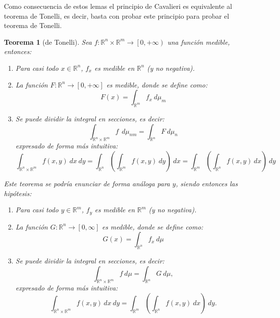 \documentclass[10pt,a4paper,openright]{book}
\theoremstyle{break}
\newtheorem*{theo}{Teorema}
\newcommand{\dif}[1]{\ d#1}
\begin{document}
Como consecuencia de estos lemas el principio de Cavalieri es equivalente al teorema de Tonelli, es decir, basta con probar este principio para probar el teorema de Tonelli.

\begin{theo}[de Tonelli]
Sea $f: \mathbb{R}^{n} \times \mathbb{R}^m \rightarrow \left[0, +\infty\right)$ una función medible, entonces: 
\begin{enumerate}
    \item Para casi todo $x \in \mathbb{R}^n$, $f_x$ es medible en $\mathbb{R}^n$ (y no negativa).
    \item La función $F: \mathbb{R}^{n} \rightarrow \left[0, +\infty\right]$ es medible, donde se define como:
        $$F \left(x\right) = \int_{\mathbb{R}^m} f_x \dif{\mu_m} $$
    \item Se puede dividir la integral en secciones, es decir:
        $$\int_{\mathbb{R}^n \times \mathbb{R}^m} f \ \dif{\mu_{nm}} = \int_{\mathbb{R}^n} F \dif{\mu_n} $$
    expresado de forma más intuitiva:
    $$\int_{\mathbb{R}^n \times \mathbb{R}^m} f \left(x, y\right) \dif{x}\dif{y} = \int_{\mathbb{R}^n}\left(\int_{\mathbb{R}^m} f \left(x, y\right) \dif{y} \right)\dif{x} = \int_{\mathbb{R}^m}\left(\int_{\mathbb{R}^n} f \left(x, y\right) \dif{x} \right)\dif{y}$$
\end{enumerate}
Este teorema se podría enunciar de forma análoga para $y$, siendo entonces las hipótesis:
\begin{enumerate}
\item Para casi todo $y \in \mathbb{R}^m$, $f_y$ es medible en $\mathbb{R}^m$ (y no negativa).
\item La función $G: \mathbb{R}^n \rightarrow \left[0, \infty\right]$ es medible, donde se define como:
$$G \left(x\right) = \int_{\mathbb{R}^n} f_x \dif{\mu}$$
\item Se puede dividir la integral en secciones, es decir:
$$\int_{\mathbb{R}^n \times \mathbb{R}^m} f \dif{\mu} = \int_{\mathbb{R}^n} G \dif{\mu},$$
expresado de forma más intuitiva:
$$\int_{\mathbb{R}^n \times \mathbb{R}^m} f \left(x, y\right) \dif{x}\dif{y} = \int_{\mathbb{R}^m} \left(\int_{\mathbb{R}^n} f \left(x, y\right) \dif{x} \right) \dif{y}.$$
\end{enumerate}
\end{theo}
\end{document}
